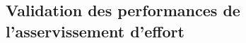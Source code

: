 \begin{multicols}{2}
\subsection{Validation des performances de l’asservissement d’effort}
%
%
%
%
%
%
%
%
%
%



\end{multicols}

